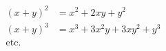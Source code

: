 \documentclass[12pt]{article}
\begin{document}
\begin{align*}
	(x+y)^2 &= x^2 + 2xy + y^2\\
	(x+y)^3 &= x^3 + 3x^2y + 3xy^2 + y^3\\
	\text{etc.}%
\end{align*}
\end{document}
